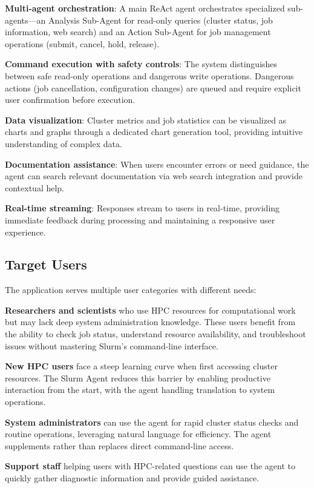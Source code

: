 \textbf{Multi-agent orchestration}: A main ReAct agent orchestrates specialized sub-agents—an Analysis Sub-Agent for read-only queries (cluster status, job information, web search) and an Action Sub-Agent for job management operations (submit, cancel, hold, release).

\textbf{Command execution with safety controls}: The system distinguishes between safe read-only operations and dangerous write operations. Dangerous actions (job cancellation, configuration changes) are queued and require explicit user confirmation before execution.

\textbf{Data visualization}: Cluster metrics and job statistics can be visualized as charts and graphs through a dedicated chart generation tool, providing intuitive understanding of complex data.

\textbf{Documentation assistance}: When users encounter errors or need guidance, the agent can search relevant documentation via web search integration and provide contextual help.

\textbf{Real-time streaming}: Responses stream to users in real-time, providing immediate feedback during processing and maintaining a responsive user experience.

\subsection{Target Users}

The application serves multiple user categories with different needs:

\textbf{Researchers and scientists} who use HPC resources for computational work but may lack deep system administration knowledge. These users benefit from the ability to check job status, understand resource availability, and troubleshoot issues without mastering Slurm's command-line interface.

\textbf{New HPC users} face a steep learning curve when first accessing cluster resources. The Slurm Agent reduces this barrier by enabling productive interaction from the start, with the agent handling translation to system operations.

\textbf{System administrators} can use the agent for rapid cluster status checks and routine operations, leveraging natural language for efficiency. The agent supplements rather than replaces direct command-line access.

\textbf{Support staff} helping users with HPC-related questions can use the agent to quickly gather diagnostic information and provide guided assistance.

